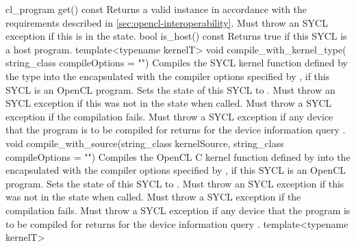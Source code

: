   \addRow
    {cl_program get() const}
    {
      Returns a valid  instance in accordance with the requirements described in \ref{sec:opencl-interoperability}. Must throw an  SYCL exception if this  is in the  state.
    }
  \addRow
    {bool is_host() const}
    {
      Returns true if this SYCL  is a host program.
    }
  \addRowThreeL
    {template<typename kernelT>}
    {void compile_with_kernel_type(}
    {string_class compileOptions = "")}
    {
      Compiles the SYCL kernel function defined by the type  into the encapsulated  with the compiler options specified by , if this SYCL  is an OpenCL program. Sets the state of this SYCL  to . Must throw an  SYCL exception if this  was not in the  state when called. Must throw a   SYCL exception if the compilation fails.  Must throw a  SYCL exception if any device that the program is to be compiled for returns  for the device information query .
    }
  \addRowTwoL
    {void compile_with_source(string_class kernelSource, }
    {string_class compileOptions = "")}
    {
      Compiles the OpenCL C kernel function defined by  into the encapsulated  with the compiler options specified by , if this SYCL  is an OpenCL program. Sets the state of this SYCL  to . Must throw an  SYCL exception if this  was not in the  state when called. Must throw a   SYCL exception if the compilation fails.  Must throw a  SYCL exception if any device that the program is to be compiled for returns  for the device information query .
    }
  \addRowThreeL
    {template<typename kernelT>}
